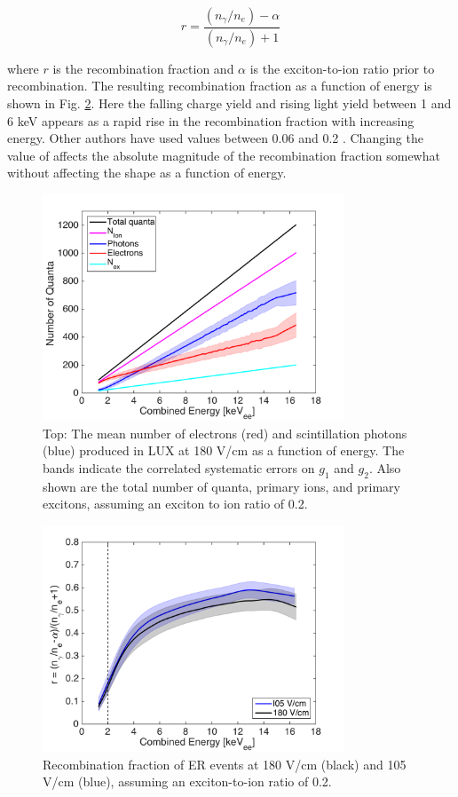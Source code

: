 \begin{equation}
r = \frac{(n_{\gamma}/n_e) - \alpha}{(n_{\gamma}/n_e) + 1}
\end{equation}

\noindent
where $r$ is the recombination fraction and $\alpha$ is the exciton-to-ion ratio prior to recombination. The resulting recombination fraction as a function of energy is shown in Fig. \ref{fig:recombination}. Here the falling charge yield and rising light yield between 1 and 6 keV appears as a rapid rise in the recombination fraction with increasing energy.  Other authors have used \alpha values between 0.06 and 0.2 \alpha\cite{kaixuan}. Changing the value of \alpha affects the absolute magnitude of the recombination fraction somewhat without affecting the shape as a function of energy.

\begin{figure}[h!]\centering
\includegraphics[width=90mm]{fig/quanta-vs-energy.png}
\caption{Top: The mean number of electrons (red) and scintillation photons (blue) produced in LUX at 180 V/cm as a function of energy. The bands indicate the correlated systematic errors on $g_1$ and $g_2$. Also shown are the total number of quanta, primary ions, and primary excitons, assuming an exciton to ion ratio of 0.2. }
\label{fig:quanta-vs-energy}
\end{figure}

\begin{figure}[h!]\centering
\includegraphics[width=90mm]{fig/recombination.png}
\caption{Recombination fraction of ER events at 180 V/cm (black) and 105 V/cm (blue), assuming an exciton-to-ion ratio of 0.2.}
\label{fig:recombination}
\end{figure}

